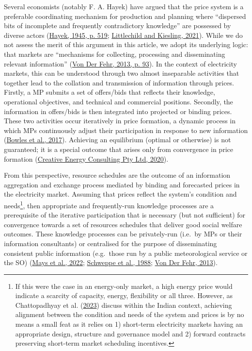 \documentclass[12pt,a4paper,]{report}
\begin{document}
Several economists (notably F. A. Hayek) have argued that the price
system is a preferable coordinating mechanism for production and
planning where ``dispersed bits of incomplete and frequently
contradictory knowledge'' are possessed by diverse actors
(\protect\hyperlink{ref-hayekUseKnowledgeSociety1945}{Hayek, 1945, p.
519};
\protect\hyperlink{ref-littlechildHayekTexasBlackout2021}{Littlechild
and Kiesling, 2021}). While we do not assess the merit of this argument
in this article, we adopt its underlying logic: that markets are
``mechanisms for collecting, processing and disseminating relevant
information''
(\protect\hyperlink{ref-vonderfehrTransparencyElectricityMarkets2013}{Von
Der Fehr, 2013, p. 93}). In the context of electricity markets, this can
be understood through two almost inseparable activities that together
lead to the collation and transmission of information through prices.
Firstly, a MP submits a set of offers/bids that reflects their
knowledge, operational objectives, and technical and commercial
positions. Secondly, the information in offers/bids is then integrated
into projected or binding prices. These two activities occur iteratively
in price formation, a dynamic process in which MPs continuously adjust
their participation in response to new information
(\protect\hyperlink{ref-bowlesRetrospectivesFriedrichHayek2017}{Bowles
et al., 2017}). Achieving an equilibrium (optimal or otherwise) is not
guaranteed; it is a special outcome that arises only from convergence in
price formation
(\protect\hyperlink{ref-creativeenergyconsultingptyltdSchedulingAheadMarkets2020}{Creative
Energy Consulting Pty Ltd, 2020}).

From this perspective, resource schedules are the outcome of an
information aggregation and exchange process mediated by binding and
forecasted prices in the electricity market. Assuming that prices
reflect the system's condition and needs\footnote{If this were the case
  in an energy-only market, a high energy price would indicate a
  scarcity of capacity, energy, flexibility or all three. However, as
  Chattopadhyay et al.
  (\protect\hyperlink{ref-chattopadhyaySpotlightSpotMarket2023}{2023})
  discuss within the Indian context, achieving alignment between the
  condition and needs of the system and prices is by no means a small
  feat as it relies on 1) short-term electricity markets having an
  appropriate design, structure and governance model and 2) forward
  contracts preserving short-term market scheduling incentives.}, then
appropriate and frequently-run knowledge processes are a prerequisite of
the iterative participation that is necessary (but not sufficient) for
convergence towards a set of resources schedules that deliver good
social welfare outcomes. These knowledge processes can be privately-run
(i.e.~by MPs or their information consultants) or centralised for the
purpose of disseminating consistent public information (e.g.~those run
by a public meteorological service or the SO)
(\protect\hyperlink{ref-maysPrivateRiskSocial2022}{Mays et al., 2022};
\protect\hyperlink{ref-schweppeSpotPricingElectricity1988}{Schweppe et
al., 1988};
\protect\hyperlink{ref-vonderfehrTransparencyElectricityMarkets2013}{Von
Der Fehr, 2013}).
\end{document}
